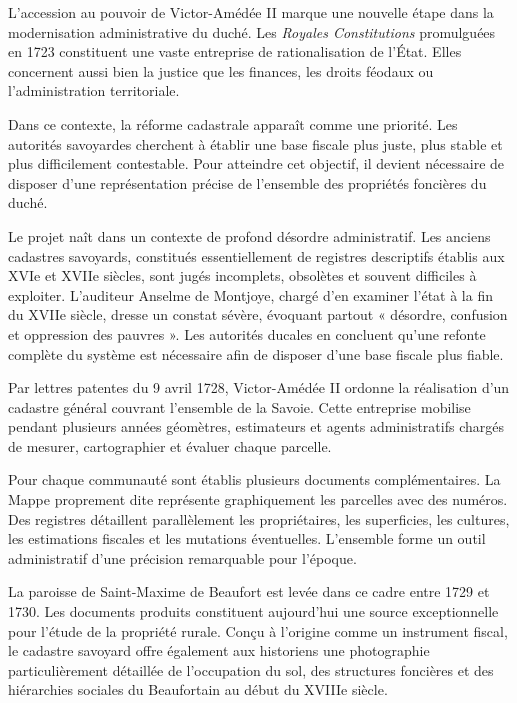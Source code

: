 \documentclass[12pt,a4paper]{report}
\begin{document}
L'accession au pouvoir de Victor-Amédée II marque une nouvelle étape dans la modernisation administrative du duché. Les \textit{Royales Constitutions} promulguées en 1723 constituent une vaste entreprise de rationalisation de l'État. Elles concernent aussi bien la justice que les finances, les droits féodaux ou l'administration territoriale.

Dans ce contexte, la réforme cadastrale apparaît comme une priorité. Les autorités savoyardes cherchent à établir une base fiscale plus juste, plus stable et plus difficilement contestable. Pour atteindre cet objectif, il devient nécessaire de disposer d'une représentation précise de l'ensemble des propriétés foncières du duché.

Le projet naît dans un contexte de profond désordre administratif. Les anciens cadastres savoyards, constitués essentiellement de registres descriptifs établis aux XVIe et XVIIe siècles, sont jugés incomplets, obsolètes et souvent difficiles à exploiter. L'auditeur Anselme de Montjoye, chargé d'en examiner l'état à la fin du XVIIe siècle, dresse un constat sévère, évoquant partout « désordre, confusion et oppression des pauvres ». Les autorités ducales en concluent qu'une refonte complète du système est nécessaire afin de disposer d'une base fiscale plus fiable.

Par lettres patentes du 9 avril 1728, Victor-Amédée II ordonne la réalisation d'un cadastre général couvrant l'ensemble de la Savoie. Cette entreprise mobilise pendant plusieurs années géomètres, estimateurs et agents administratifs chargés de mesurer, cartographier et évaluer chaque parcelle.

Pour chaque communauté sont établis plusieurs documents complémentaires. La Mappe proprement dite représente graphiquement les parcelles avec des numéros. Des registres détaillent parallèlement les propriétaires, les superficies, les cultures, les estimations fiscales et les mutations éventuelles. L'ensemble forme un outil administratif d'une précision remarquable pour l'époque.

La paroisse de Saint-Maxime de Beaufort est levée dans ce cadre entre 1729 et 1730. Les documents produits constituent aujourd'hui une source exceptionnelle pour l'étude de la propriété rurale. Conçu à l'origine comme un instrument fiscal, le cadastre savoyard offre également aux historiens une photographie particulièrement détaillée de l'occupation du sol, des structures foncières et des hiérarchies sociales du Beaufortain au début du XVIIIe siècle.
\end{document}
